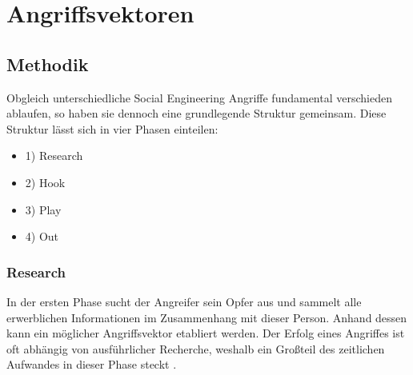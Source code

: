 \section{Angriffsvektoren}

\subsection{Methodik}

Obgleich unterschiedliche Social Engineering Angriffe fundamental verschieden ablaufen,
so haben sie dennoch eine grundlegende Struktur gemeinsam.
Diese Struktur lässt sich in vier Phasen einteilen:

\begin{minipage}{.5\linewidth}
    \begin{itemize}
        \setlength\itemsep{1em}
        \item 1) Research
        \item 2) Hook
        \item 3) Play
        \item 4) Out
    \end{itemize}
\end{minipage}
\hfill
\begin{minipage}{.5\linewidth}
    \centering
\end{minipage}

\subsubsection{Research}
In der ersten Phase sucht der Angreifer sein Opfer aus und sammelt alle erwerblichen Informationen
im Zusammenhang mit dieser Person. Anhand dessen kann ein möglicher Angriffsvektor etabliert werden.
Der Erfolg eines Angriffes ist oft abhängig von ausführlicher Recherche, weshalb ein Großteil des zeitlichen
Aufwandes in dieser Phase steckt .

